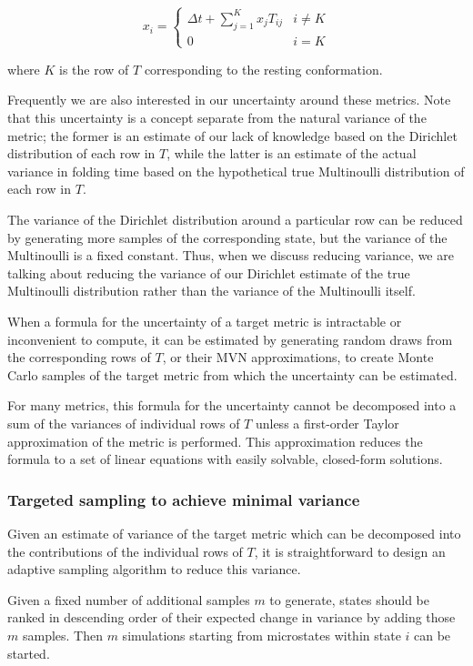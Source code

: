 \documentclass{article}
\begin{document}
\begin{equation*}
    x_i =
    \begin{cases}
    \Delta t + \sum_{j=1}^K x_jT_{ij} & i \neq K \\
    0 & i = K
    \end{cases}
\end{equation*}

\noindent where $K$ is the row of $T$ corresponding to the resting conformation.

Frequently we are also interested in our uncertainty around these metrics. Note that this uncertainty is a concept separate from the natural variance of the metric; the former is an estimate of our lack of knowledge based on the Dirichlet distribution of each row in $T$, while the latter is an estimate of the actual variance in folding time based on the hypothetical true Multinoulli distribution of each row in $T$. 

The variance of the Dirichlet distribution around a particular row can be reduced by generating more samples of the corresponding state, but the variance of the Multinoulli is a fixed constant. Thus, when we discuss reducing variance, we are talking about reducing the variance of our Dirichlet estimate of the true Multinoulli distribution rather than the variance of the Multinoulli itself.

When a formula for the uncertainty of a target metric is intractable or inconvenient to compute, it can be estimated by generating random draws from the corresponding rows of $T$, or their MVN approximations, to create Monte Carlo samples of the target metric from which the uncertainty can be estimated. 

For many metrics, this formula for the uncertainty cannot be decomposed into a sum of the variances of individual rows of $T$ unless a first-order Taylor approximation of the metric is performed. This approximation reduces the formula to a set of linear equations with easily solvable, closed-form solutions.

\subsubsection{Targeted sampling to achieve minimal variance}
Given an estimate of variance of the target metric which can be decomposed into the contributions of the individual rows of $T$, it is straightforward to design an adaptive sampling algorithm to reduce this variance. 

Given a fixed number of additional samples $m$ to generate, states should be ranked in descending order of their expected change in variance by adding those $m$ samples. Then $m$ simulations starting from microstates within state $i$ can be started. 
\end{document}
